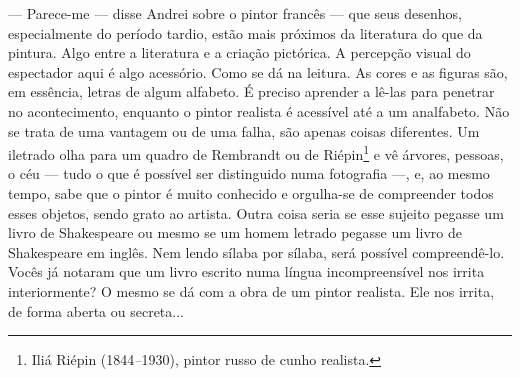 --- Parece-me --- disse Andrei sobre o pintor francês --- que seus
desenhos, especialmente do período tardio, estão mais próximos da
literatura do que da pintura. Algo entre a literatura e a criação
pictórica. A percepção visual do espectador aqui é algo acessório. Como
se dá na leitura. As cores e as figuras são, em essência, letras de
algum alfabeto. É preciso aprender a lê-las para penetrar no
acontecimento, enquanto o pintor realista é acessível até a um
analfabeto. Não se trata de uma vantagem ou de uma falha, são apenas
coisas diferentes. Um iletrado olha para um quadro de Rembrandt ou de
Riépin\footnote{Iliá Riépin (1844\emph{--}1930), pintor russo de cunho
  realista.} e vê árvores, pessoas, o céu --- tudo o que é possível ser
distinguido numa fotografia ---, e, ao mesmo tempo, sabe que o pintor é
muito conhecido e orgulha-se de compreender todos esses objetos, sendo
grato ao artista. Outra coisa seria se esse sujeito pegasse um livro de
Shakespeare ou mesmo se um homem letrado pegasse um livro de Shakespeare
em inglês. Nem lendo sílaba por sílaba, será possível compreendê-lo.
Vocês já notaram que um livro escrito numa língua incompreensível nos
irrita interiormente? O mesmo se dá com a obra de um pintor realista.
Ele nos irrita, de forma aberta ou secreta...

